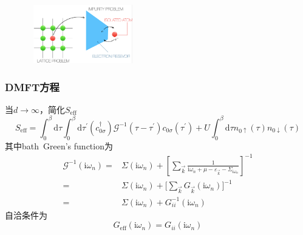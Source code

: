 {\begin{minipage}[b]{0.39\linewidth}
\begin{figure}[h!]
\centering
\vspace{-20pt}
\includegraphics[height=1.0in,width=1.85in,viewport=0 0 750 455,clip]{Figures/Dmft_lattice-atom.png}
\label{Dmft_lattice-atom.}
\end{figure}
\end{minipage}
}

\frame
{
	\frametitle{\textrm{DMFT}方程}
	当$d\rightarrow\infty$，简化$S_{\mathrm{eff}}$
	\begin{displaymath}
		S_{\mathrm{eff}}=\int_0^{\beta}\mathrm{d}\tau\int_0^{\beta}\mathrm{d}\tau^{\prime}(c_{0\sigma}^{\dag})\mathcal{G}^{-1}(\tau-\tau^{\prime})c_{0\sigma}(\tau^{\prime})+U\int_0^{\beta}\mathrm{d}\tau n_{0\uparrow}(\tau)n_{0\downarrow}(\tau)
	\end{displaymath}
	其中\textrm{bath~Green's function}为
	\begin{displaymath}
		\begin{aligned}
			\mathcal{G}^{-1}(\mathrm{i}\omega_n)=&\Sigma(\mathrm{i}\omega_n)+\left[\sum_{\vec k}\frac1{\mathrm{i}\omega_n+\mu-\varepsilon_{\vec k}-\Sigma_{\mathrm{i}\omega_n}}\right]^{-1}\\
			=&\Sigma(\mathrm{i}\omega_n)+\big[\sum_{\vec k}G_{\vec k}(\mathrm{i}\omega_n)\big]^{-1}\\
			=&\Sigma(\mathrm{i}\omega_n)+G_{ii}^{-1}(\mathrm{i}\omega_n)
		\end{aligned}
	\end{displaymath}
	自洽条件为
	\begin{displaymath}
		G_{\mathrm{eff}}(\mathrm{i}\omega_n)=G_{ii}(\mathrm{i}\omega_n)
	\end{displaymath}
}

